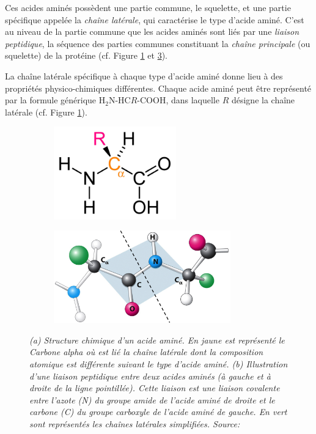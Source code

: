 Ces acides aminés possèdent une partie commune, le squelette, et une partie spécifique appelée la \textit{chaîne latérale}, qui caractérise le type d'acide aminé. C'est au niveau de la partie commune que les acides aminés sont liés par une \textit{liaison peptidique}, la séquence des parties communes constituant la \textit{chaîne principale} (ou squelette) de la protéine (cf. Figure \ref{Fig:amino_acid_structure} et \ref{Fig:peptide_bond}). 

La chaîne latérale spécifique à chaque type d'acide aminé donne lieu à des propriétés physico-chimiques différentes. Chaque acide aminé peut être représenté par la formule générique H$_{2}$N-HC$R$-COOH, dans laquelle $R$ désigne la chaîne latérale (cf. Figure \ref{Fig:amino_acid_structure}).

\begin{figure}
  \begin{subfigure}{.4\textwidth}
  \centering
  {\includegraphics[height=4cm]{./figures/ch1/amino_acid_structure}}
    \caption{}
    \label{Fig:amino_acid_structure}
  \end{subfigure}
  \begin{subfigure}{.6\textwidth}
  \centering
  {\includegraphics[height=4cm]{./figures/ch1/peptidic_bond.png}}
    \caption{}
    \label{Fig:peptide_bond}
  \end{subfigure}
  \caption[(a) Structure chimique d'un acide aminé. (b) Illustration d'une liaison peptidique entre deux acides aminés.]{\it (a) Structure chimique d'un acide aminé. En jaune est représenté le Carbone alpha où est lié la chaîne latérale dont la composition atomique est différente suivant le type d'acide aminé.
  (b) Illustration d'une liaison peptidique entre deux acides aminés (à gauche et à droite de la ligne pointillée). Cette liaison est une liaison covalente entre l'azote (N) du groupe amide de l'acide aminé de droite et le carbone (C) du groupe carboxyle de l'acide aminé de gauche. En vert sont représentés les chaînes latérales simplifiées. Source: \cite{berg_biochemistry_2012}}
\end{figure}
